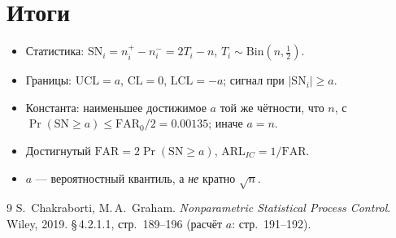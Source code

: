 \documentclass[11pt,a4paper]{article}
\newcommand{\SN}{\mathrm{SN}}
\newcommand{\FAR}{\mathrm{FAR}}
\newcommand{\ARL}{\mathrm{ARL}}
\newcommand{\FARz}{\FAR_0}
\begin{document}
\section{Итоги}

\begin{itemize}
\item Статистика: $\SN_i=n_i^{+}-n_i^{-}=2T_i-n$, $T_i\sim\mathrm{Bin}(n,\tfrac12)$.
\item Границы: $\mathrm{UCL}=a$, $\mathrm{CL}=0$, $\mathrm{LCL}=-a$; сигнал при $|\SN_i|\ge a$.
\item Константа: наименьшее достижимое $a$ той же чётности, что $n$,
      с $\Pr(\SN\ge a)\le\FARz/2=0.00135$; иначе $a=n$.
\item Достигнутый $\FAR=2\Pr(\SN\ge a)$, $\ARL_{IC}=1/\FAR$.
\item $a$ --- вероятностный квантиль, а \emph{не} кратно $\sqrt{n}$.
\end{itemize}

\begin{thebibliography}{9}
S.~Chakraborti, M.\,A.~Graham.
\textit{Nonparametric Statistical Process Control}.
Wiley, 2019. \S\,4.2.1.1, стр.~189--196 (расчёт $a$: стр.~191--192).
\end{thebibliography}
\end{document}
